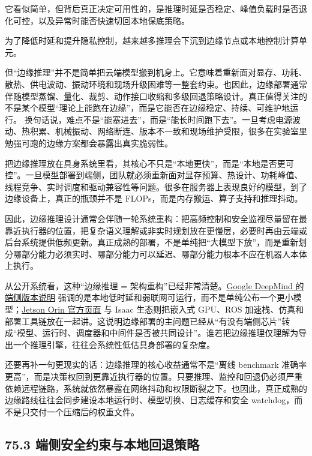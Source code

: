 它看似简单，但背后真正决定可用性的，是推理时延是否稳定、峰值负载时是否退化可控，以及异常时能否快速切回本地保底策略。

为了降低时延和提升隐私控制，越来越多推理会下沉到边缘节点或本地控制计算单元。

但“边缘推理”并不是简单把云端模型搬到机身上。它意味着重新面对显存、功耗、散热、供电波动、振动环境和现场升级困难等一整套约束。也因此，边缘部署通常伴随模型蒸馏、量化、裁剪、动作接口收缩和多级回退策略设计。真正值得关注的不是某个模型“理论上能跑在边缘”，而是它能否在边缘稳定、持续、可维护地运行。 换句话说，难点不是“能塞进去”，而是“能长时间跑下去”。一旦考虑电源波动、热积累、机械振动、网络断连、版本不一致和现场维护受限，很多在实验室里勉强可跑的边缘方案都会暴露出真实脆弱性。

把边缘推理放在具身系统里看，其核心不只是“本地更快”，而是“本地是否更可控”。一旦模型部署到端侧，团队就必须重新面对显存预算、热设计、功耗峰值、线程竞争、实时调度和驱动兼容性等问题。很多在服务器上表现良好的模型，到了边缘设备上，真正的瓶颈并不是 FLOPs，而是内存搬运、算子支持和推理抖动。

因此，边缘推理设计通常会伴随一轮系统重构：把高频控制和安全监视尽量留在最靠近执行器的位置，把复杂语义理解或非实时规划放在更慢层，必要时再由云端或后台系统提供低频更新。真正成熟的部署，不是单纯把“大模型下放”，而是重新划分哪部分能力必须实时、哪部分能力可以延迟、哪部分能力根本不应在机器人本体上执行。

从公开系统看，这种“边缘推理 = 架构重构”已经非常清楚。\href{https://deepmind.google/blog/gemini-robotics-on-device-brings-ai-to-local-robotic-devices/}{Google DeepMind 的端侧版本说明} 强调的是本地低时延和弱联网可运行，而不是单纯公布一个更小模型；\href{https://www.nvidia.com/en-us/autonomous-machines/embedded-systems/jetson-orin/}{Jetson Orin 官方页面} 与 Isaac 生态则把嵌入式 GPU、ROS 加速栈、仿真和部署工具链放在一起讲。这说明边缘部署的主问题已经从“有没有端侧芯片”转成“模型、运行时、调度器和中间件是否被共同设计”。谁若把边缘推理仅理解为导出一个推理引擎，往往会系统性低估具身部署的复杂度。

还要再补一句更现实的话：边缘推理的核心收益通常不是“离线 benchmark 准确率更高”，而是决策权回到更靠近执行器的位置。只要推理、监控和回退仍必须严重依赖远程链路，系统就依然暴露在网络抖动和权限断裂之下。也因此，真正成熟的边缘路线往往会同步建设本地运行时、模型切换、日志缓存和安全 watchdog，而不是只交付一个压缩后的权重文件。

\subsection*{75.3 端侧安全约束与本地回退策略}


